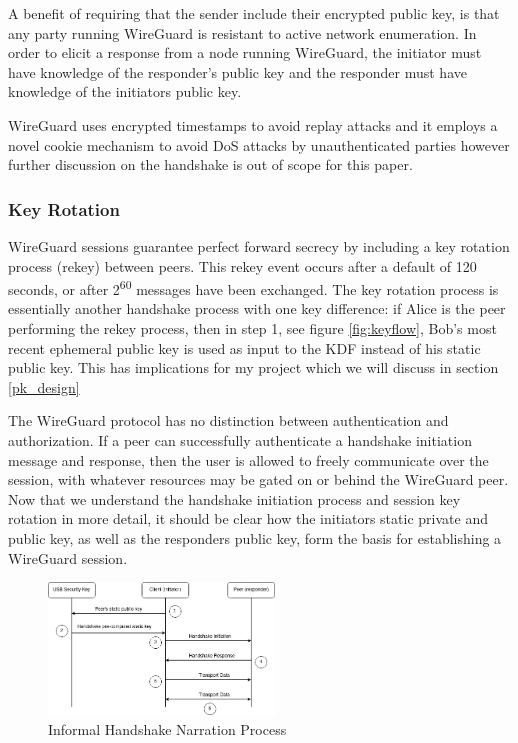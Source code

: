 \documentclass [11pt, proquest] {uwthesis}[2020/02/24]
\begin{document}
A benefit of requiring that the sender include their encrypted public key, is that any party running WireGuard is resistant to active network enumeration. In order to elicit a response from a node running WireGuard, the initiator must have knowledge of the responder's public key and the responder must have knowledge of the initiators public key.

WireGuard uses encrypted timestamps to avoid replay attacks and it employs a novel cookie mechanism to avoid DoS attacks by unauthenticated parties however further discussion on the handshake is out of scope for this paper.

\subsubsection{Key Rotation}
\label{keyrotate}
WireGuard sessions guarantee perfect forward secrecy by including a key rotation process (rekey) between peers. This rekey event occurs after a default of 120 seconds, or after 2\textsuperscript{60} messages have been exchanged. The key rotation process is essentially another handshake process with one key difference: if Alice is the peer performing the rekey process, then in step 1, see figure \ref{fig:keyflow}, Bob's most recent ephemeral public key is used as input to the KDF instead of his static public key. This has implications for my project which we will discuss in section \ref{pk_design}

The WireGuard protocol has no distinction between authentication and authorization. If a peer can successfully authenticate a handshake initiation message and response, then the user is allowed to freely communicate over the session, with whatever resources may be gated on or behind the WireGuard peer.
Now that we understand the handshake initiation process and session key rotation in more detail, it should be clear how the initiators static private and public key, as well as the responders public key, form the basis for establishing a WireGuard session.

\begin{figure}[ht]
\includegraphics[width=6cm]{paper/images/Process_Diagram.png}
\caption{Informal Handshake Narration Process}
\label{fig:handshake_process}
\end{figure}
\end{document}
